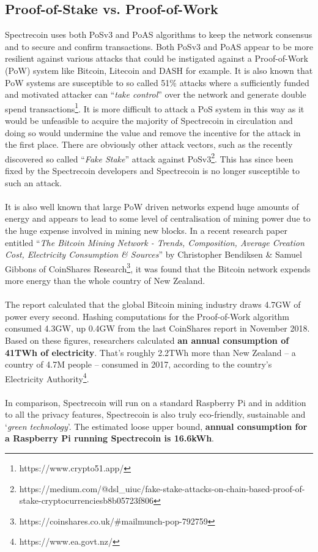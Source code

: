 \subsection{Proof-of-Stake vs. Proof-of-Work}
Spectrecoin uses both PoSv3 and PoAS algorithms to keep the network consensus and to secure and confirm transactions. Both PoSv3 and PoAS appear to be more resilient against various attacks that could be instigated against a Proof-of-Work (PoW) system like Bitcoin, Litecoin and DASH for example. It is also known that PoW systems are susceptible to so called 51\% attacks where a sufficiently funded and motivated attacker can “\textit{take control}” over the network and generate double spend transactions\footnote{https://www.crypto51.app/}. It is more difficult to attack a PoS system in this way as it would be unfeasible to acquire the majority of Spectrecoin in circulation and doing so would undermine the value and remove the incentive for the attack in the first place. There are obviously other attack vectors, such as the recently discovered so called “\textit{Fake Stake}” attack against PoSv3\footnote{https://medium.com/@dsl\_uiuc/fake-stake-attacks-on-chain-based-proof-of-stake-cryptocurrenciesb8b05723f806}. This has since been fixed by the Spectrecoin developers and Spectrecoin is no longer susceptible to such an attack.
\\
\\
\noindent
It is also well known that large PoW driven networks expend huge amounts of energy and appears to lead to some level of centralisation of mining power due to the huge expense involved in mining new blocks. In a recent research paper entitled “\textit{The Bitcoin Mining Network - Trends, Composition, Average Creation Cost, Electricity Consumption \& Sources}” by Christopher Bendiksen \& Samuel Gibbons of CoinShares  Research\footnote{https://coinshares.co.uk/\#mailmunch-pop-792759}, 
it was found that the Bitcoin network expends more energy than the whole country of New Zealand.
\\
\\
\noindent
The report calculated that the global Bitcoin mining industry draws 4.7GW of power every second. Hashing computations for the Proof-of-Work algorithm consumed 4.3GW, up 0.4GW from the last CoinShares report in November 2018. Based on these figures, researchers calculated \textbf{an annual consumption of 41TWh of electricity}. That’s roughly 2.2TWh more than New Zealand – a country of 4.7M people – consumed in 2017, according to the country’s Electricity Authority\footnote{https://www.ea.govt.nz/}.
\\
\\
\noindent
In comparison, Spectrecoin will run on a standard Raspberry Pi and in addition to all the privacy features, Spectrecoin is also truly eco-friendly, sustainable and ‘\textit{green technology}’. The estimated loose upper bound, \textbf{annual 
consumption for a Raspberry Pi running Spectrecoin is 16.6kWh}.

